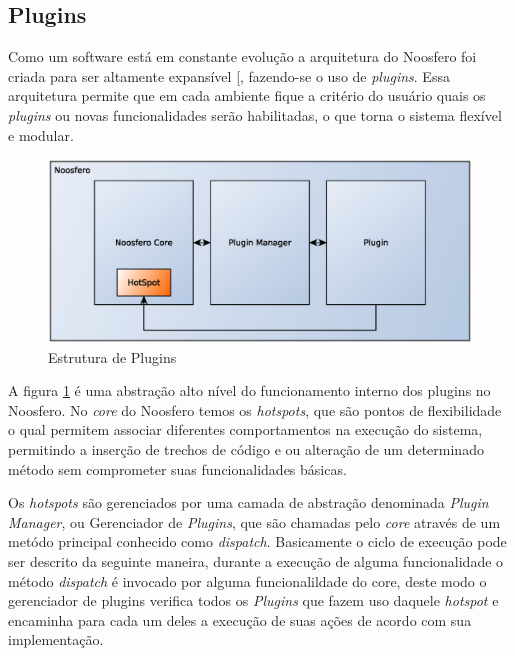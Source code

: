 \subsection{Plugins}

Como um software está em constante evolução a arquitetura do Noosfero foi criada para ser altamente expansível [, fazendo-se o uso de \textit{plugins}. Essa arquitetura permite que em cada ambiente fique a critério do usuário quais os \textit{plugins} ou novas funcionalidades serão habilitadas, o que torna o sistema flexível e modular.

\begin{figure}[h]
    \centering
    \includegraphics[keepaspectratio=true,scale=0.4]
      {figuras/estruturaDePlugins.eps}
    \caption{Estrutura de Plugins}
    \label{estrutura-plugins}
\end{figure}

A figura \ref{estrutura-plugins} é uma abstração alto nível do funcionamento interno dos plugins no Noosfero. No \textit{core} do Noosfero temos os \textit{hotspots}, que são pontos de flexibilidade o qual permitem associar diferentes comportamentos na execução do sistema, permitindo a inserção de trechos de código e ou alteração de um determinado método sem comprometer suas funcionalidades básicas.

Os \textit{hotspots} são gerenciados por uma camada de abstração denominada \textit{Plugin Manager}, ou Gerenciador de \textit{Plugins}, que são chamadas pelo \textit{core} através de um metódo principal conhecido como \textit{dispatch}. Basicamente o ciclo de execução pode ser descrito da seguinte maneira, durante a execução de alguma funcionalidade o método \textit{dispatch} é invocado por alguma funcionalildade do core, deste modo o gerenciador de plugins verifica todos os \textit{Plugins} que fazem uso daquele \textit{hotspot} e encaminha para cada um deles a execução de suas ações de acordo com sua implementação.

